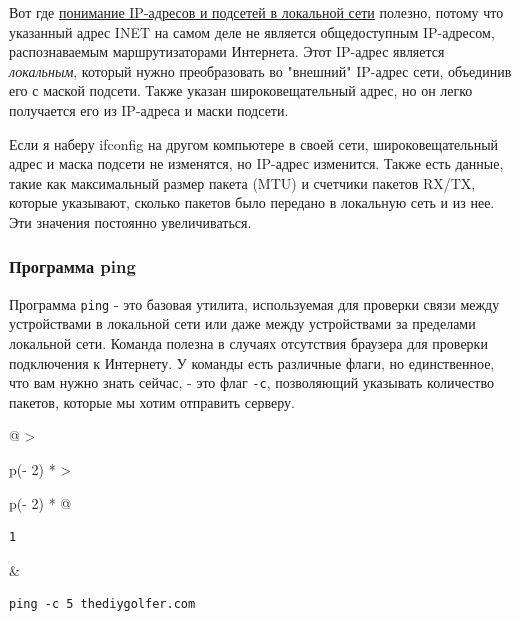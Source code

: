 \documentclass{report}
\begin{document}
Вот где \href{blog/2019/ip-addresses-netmasks}{понимание IP-адресов и
подсетей в локальной сети} полезно, потому что указанный адрес INET на
самом деле не является общедоступным IP-адресом, распознаваемым
маршрутизаторами Интернета. Этот IP-адрес является \emph{локальным},
который нужно преобразовать во "внешний" IP-адрес сети, объединив его с
маской подсети. Также указан широковещательный адрес, но он легко
получается его из IP-адреса и маски подсети.

Если я наберу ifconfig на другом компьютере в своей сети,
широковещательный адрес и маска подсети не изменятся, но IP-адрес
изменится. Также есть данные, такие как максимальный размер пакета (MTU)
и счетчики пакетов RX/TX, которые указывают, сколько пакетов было
передано в локальную сеть и из нее. Эти значения постоянно
увеличиваться.

\hypertarget{ping}{%
\subsubsection{\texorpdfstring{\protect\hyperlink{ping}{}Программа
ping}{Программа ping}}\label{ping}}

Программа \texttt{ping} - это базовая утилита, используемая для проверки
связи между устройствами в локальной сети или даже между устройствами за
пределами локальной сети. Команда полезна в случаях отсутствия браузера
для проверки подключения к Интернету. У команды есть различные флаги, но
единственное, что вам нужно знать сейчас, - это флаг \texttt{-c},
позволяющий указывать количество пакетов, которые мы хотим отправить
серверу.

\begin{longtable}[]{@{}
  >{\raggedright\arraybackslash}p{(\columnwidth - 2\tabcolsep) * }
  >{\raggedright\arraybackslash}p{(\columnwidth - 2\tabcolsep) * }@{}}
\toprule
\endhead
\begin{minipage}[t]{\linewidth}\raggedright
\begin{verbatim}
1
\end{verbatim}
\end{minipage} & \begin{minipage}[t]{\linewidth}\raggedright
\begin{verbatim}
ping -c 5 thediygolfer.com
\end{verbatim}
\end{minipage} \\ \addlinespace
\bottomrule
\end{longtable}
\end{document}
